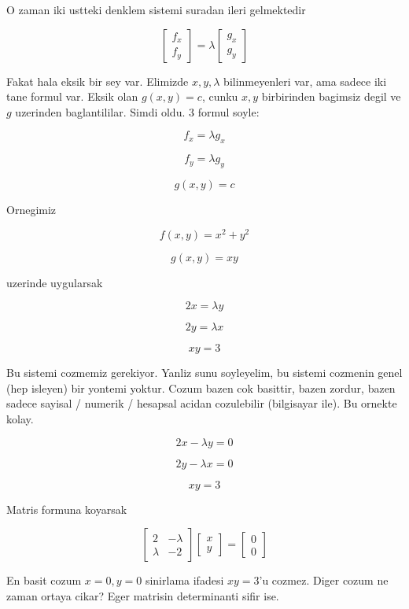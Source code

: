 \documentclass[12pt,fleqn]{article}
\begin{document}
O zaman iki ustteki denklem sistemi suradan ileri gelmektedir

\[ 
\left[\begin{array}{r}
f_x \\
f_y
\end{array}\right]  = 
\lambda
\left[\begin{array}{r}
g_x \\
g_y
\end{array}\right]
 \]

Fakat hala eksik bir sey var. Elimizde $x,y,\lambda$ bilinmeyenleri var,
ama sadece iki tane formul var. Eksik olan $g(x,y) = c$, cunku $x,y$
birbirinden bagimsiz degil ve $g$ uzerinden baglantililar. Simdi oldu. 3
formul soyle:

\[ f_x = \lambda g_x \]

\[ f_y = \lambda g_y \]

\[ g(x,y) = c \]

Ornegimiz 

\[ f(x,y) = x^2 + y^2 \]

\[ g(x,y) = xy  \]

uzerinde uygularsak

\[ 2x = \lambda y \]

\[ 2y = \lambda x \]

\[ xy = 3 \]

Bu sistemi cozmemiz gerekiyor. Yanliz sunu soyleyelim, bu sistemi cozmenin
genel (hep isleyen) bir yontemi yoktur. Cozum bazen cok basittir, bazen
zordur, bazen sadece sayisal / numerik / hesapsal acidan cozulebilir
(bilgisayar ile). Bu ornekte kolay. 

\[ 2x - \lambda y = 0\]

\[ 2y - \lambda x = 0 \]

\[ xy = 3 \]

Matris formuna koyarsak

\[ 
\left[\begin{array}{rr}
2 & -\lambda \\
\lambda & -2
\end{array}\right]
\left[\begin{array}{r}
x \\ y
\end{array}\right]
=
\left[\begin{array}{r}
0 \\ 0
\end{array}\right]
 \]

En basit cozum $x=0,y=0$ sinirlama ifadesi $xy=3$'u cozmez. Diger cozum ne
zaman ortaya cikar? Eger matrisin determinanti sifir ise. 
\end{document}

